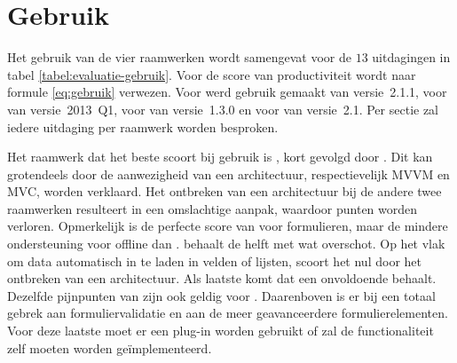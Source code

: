 \section{Gebruik}
\label{sec:evaluatie-gebruik}
Het gebruik van de vier raamwerken wordt samengevat voor de $13$ uitdagingen in tabel \ref{tabel:evaluatie-gebruik}.
Voor de score van productiviteit wordt naar formule \ref{eq:gebruik} verwezen.
Voor \st{} werd gebruik gemaakt van versie~2.1.1, voor \kendo{} van versie~2013~Q1, voor \jqm{} van versie~1.3.0 en voor \lungo{} van versie~2.1.
Per sectie zal iedere uitdaging per raamwerk worden besproken.

\begin{table}[H]
\centering
{}
\caption{Overzicht van gebruik voor \st{}~(\sta), \kendo{}~(\kendoa), \jqm{}~(\jqma) en \lungo{}~(\lungoa).}
\label{tabel:evaluatie-gebruik}
\end{table}

Het raamwerk dat het beste scoort bij gebruik is \kendo{}, kort gevolgd door \st{}.
Dit kan grotendeels door de aanwezigheid van een architectuur, respectievelijk MVVM en MVC, worden verklaard.
Het ontbreken van een architectuur bij de andere twee raamwerken resulteert in een omslachtige aanpak, waardoor punten worden verloren.
Opmerkelijk is de perfecte score van \kendo{} voor formulieren, maar de mindere ondersteuning voor offline dan \st{}.
\jqm{} behaalt de helft met wat overschot.
Op het vlak om data automatisch in te laden in velden of lijsten, scoort het nul door het ontbreken van een architectuur. 
Als laatste komt \lungo{} dat een onvoldoende behaalt.
Dezelfde pijnpunten van \jqm{} zijn ook geldig voor \lungo{}.
Daarenboven is er bij \lungo{} een totaal gebrek aan formuliervalidatie en aan de meer geavanceerdere formulierelementen.
Voor deze laatste moet er een plug-in worden gebruikt of zal de functionaliteit zelf moeten worden geïmplementeerd. 


